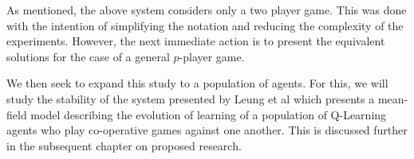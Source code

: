 \documentclass[.../main.tex]{subfiles}
\begin{document}
    As mentioned, the above system considers only a two player game. This was done with the intention
    of simplifying the notation and reducing the complexity of the experiments. However, the next
    immediate action is to present the equivalent solutions for the case of a general $p$-player
    game.
    
    We then seek to expand this study to a population of agents. For
    this, we will study the stability of the system presented by Leung
    et al \cite{Hu2019} which presents a mean-field model describing
    the evolution of learning of a population of Q-Learning agents who
    play co-operative games against one another. This is discussed further in the subsequent chapter
    on proposed research.
\end{document}
